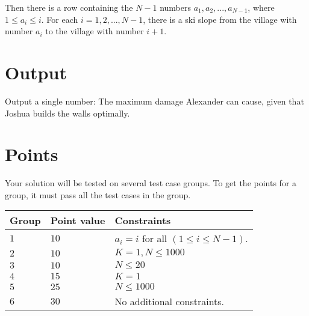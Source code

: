 Then there is a row containing the $N-1$ numbers $a_1, a_2, ..., a_{N-1}$, where $1 \le a_i \le i$.
For each $i = 1, 2, ..., N-1$, there is a ski slope from the village with number $a_i$ to the village with number $i+1$.

\section*{Output}
Output a single number: The maximum damage Alexander can cause, given that Joshua builds the walls optimally.

\section*{Points}
Your solution will be tested on several test case groups.
To get the points for a group, it must pass all the test cases in the group.

\noindent
\begin{tabular}{| l | l | p{12cm} |}
  \hline
  \textbf{Group} & \textbf{Point value} & \textbf{Constraints} \\ \hline
  $1$    & $10$       & $a_i = i$ for all $(1 \le i \le N-1)$. \\ \hline
  $2$    & $10$       & $K = 1, N \le 1000$ \\ \hline
  $3$    & $10$       & $N \le 20$ \\ \hline
  $4$    & $15$       & $K = 1$ \\ \hline
  $5$    & $25$       & $N \leq 1000$ \\ \hline
  $6$    & $30$       & No additional constraints. \\ \hline
\end{tabular}

